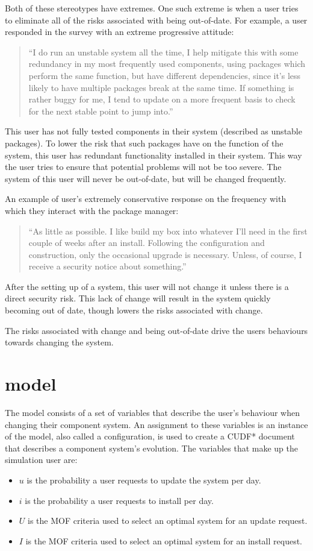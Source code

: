 Both of these stereotypes have extremes.
One such extreme is when a user tries to eliminate all of the risks associated with being out-of-date.
For example, a user responded in the survey with an extreme progressive attitude:
\begin{quotation}
``I do run an unstable system all the time, I help mitigate this with some redundancy in my most frequently used components, 
using packages which perform the same function, but have different dependencies, since it's less likely to have multiple packages break at the same time. 
If something is rather buggy for me, I tend to update on a more frequent basis to check for the next stable point to jump into.''
\end{quotation}
This user has not fully tested components in their system (described as unstable packages).
To lower the risk that such packages have on the function of the system, this user has redundant functionality installed in their system.
This way the user tries to ensure that potential problems will not be too severe.
The system of this user will never be out-of-date, but will be changed frequently.

An example of user's extremely conservative response on the frequency with which they interact with the package manager:
\begin{quotation}
``As little as possible. I like build my box into whatever I'll need in the first couple of weeks after an install. 
Following the configuration and construction, only the occasional upgrade is necessary. 
Unless, of course, I receive a security notice about something.''
\end{quotation}
After the setting up of a system, this user will not change it unless there is a direct security risk.
This lack of change will result in the system quickly becoming out of date, though lowers the risks associated with change.

The risks associated with change and being out-of-date drive the users behaviours towards changing the system. 

\section{\usermodel model}
The \usermodel model consists of a set of variables that describe the user's behaviour when changing their component system.
An assignment to these variables is an instance of the \usermodel model, also called a configuration, is used to create a CUDF* document that describes a component system's evolution.
The variables that make up the simulation user are: 
\begin{itemize}
  \item $u$ is the probability a user requests to update the system per day.
  \item $i$ is the probability a user requests to install per day.
  \item $U$ is the MOF criteria used to select an optimal system for an update request.
  \item $I$ is the MOF criteria used to select an optimal system for an install request.
\end{itemize}

